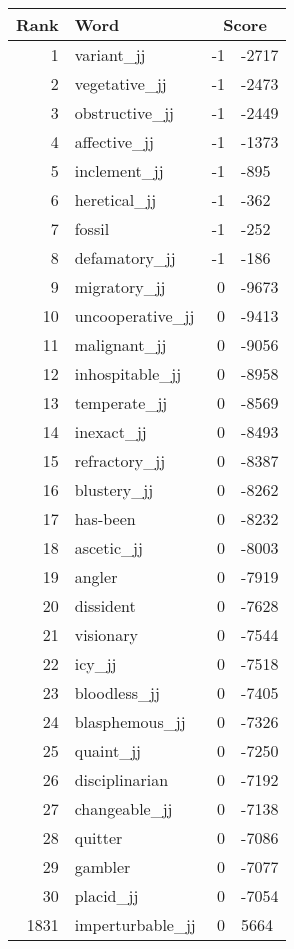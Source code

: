 \begin{longtable}[!htbp]{| rlr@{.}l |}
    \hline
    \textbf{Rank} & \textbf{Word} & \multicolumn{2}{c|}{\textbf{Score}} \\
    \hline
    \endhead
    1 & variant\_jj & -1 & -2717 \\
    2 & vegetative\_jj & -1 & -2473 \\
    3 & obstructive\_jj & -1 & -2449 \\
    4 & affective\_jj & -1 & -1373 \\
    5 & inclement\_jj & -1 & -895 \\
    6 & heretical\_jj & -1 & -362 \\
    7 & fossil & -1 & -252 \\
    8 & defamatory\_jj & -1 & -186 \\
    9 & migratory\_jj & 0 & -9673 \\
    10 & uncooperative\_jj & 0 & -9413 \\
    11 & malignant\_jj & 0 & -9056 \\
    12 & inhospitable\_jj & 0 & -8958 \\
    13 & temperate\_jj & 0 & -8569 \\
    14 & inexact\_jj & 0 & -8493 \\
    15 & refractory\_jj & 0 & -8387 \\
    16 & blustery\_jj & 0 & -8262 \\
    17 & has-been & 0 & -8232 \\
    18 & ascetic\_jj & 0 & -8003 \\
    19 & angler & 0 & -7919 \\
    20 & dissident & 0 & -7628 \\
    21 & visionary & 0 & -7544 \\
    22 & icy\_jj & 0 & -7518 \\
    23 & bloodless\_jj & 0 & -7405 \\
    24 & blasphemous\_jj & 0 & -7326 \\
    25 & quaint\_jj & 0 & -7250 \\
    26 & disciplinarian & 0 & -7192 \\
    27 & changeable\_jj & 0 & -7138 \\
    28 & quitter & 0 & -7086 \\
    29 & gambler & 0 & -7077 \\
    30 & placid\_jj & 0 & -7054 \\
    1831 & imperturbable\_jj & 0 & 5664 \\

\end{longtable}
